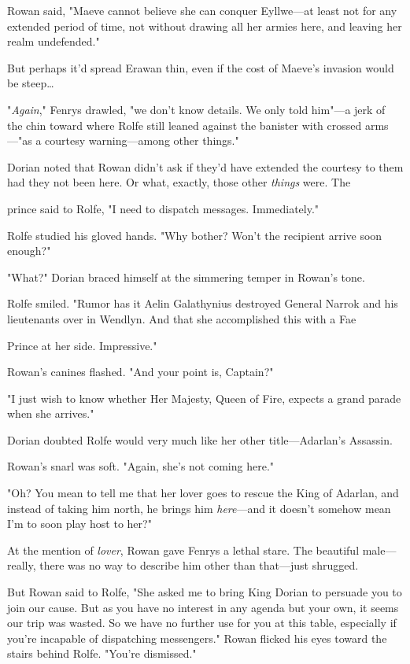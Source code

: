 Rowan said, "Maeve cannot believe she can conquer Eyllwe---at least not for any extended period of time, not without drawing all her armies here, and leaving her realm undefended."

But perhaps it'd spread Erawan thin, even if the cost of Maeve's invasion would be steep\ldots{}

"\emph{Again}," Fenrys drawled, "we don't know details. We only told him"---a jerk of the chin toward where Rolfe still leaned against the banister with crossed arms---"as a courtesy warning---among other things."

Dorian noted that Rowan didn't ask if they'd have extended the courtesy to them had they not been here. Or what, exactly, those other
\emph{things} were. The

prince said to Rolfe, "I need to dispatch messages. Immediately."

Rolfe studied his gloved hands. "Why bother? Won't the recipient arrive soon enough?"

"What?" Dorian braced himself at the simmering temper in Rowan's tone.

Rolfe smiled. "Rumor has it Aelin Galathynius destroyed General Narrok and his lieutenants over in Wendlyn. And that she accomplished this with a Fae

Prince at her side. Impressive."

Rowan's canines flashed. "And your point is, Captain?"

"I just wish to know whether Her Majesty, Queen of Fire, expects a grand parade when she arrives."

Dorian doubted Rolfe would very much like her other title---Adarlan's Assassin.

Rowan's snarl was soft. "Again, she's not coming here."

"Oh? You mean to tell me that her lover goes to rescue the King of Adarlan, and instead of taking him north, he brings him
\emph{here}---and it doesn't somehow mean I'm to soon play host to her?"

At the mention of \emph{lover}, Rowan gave Fenrys a lethal stare. The beautiful male---really, there was no way to describe him other than that---just shrugged.

But Rowan said to Rolfe, "She asked me to bring King Dorian to persuade you to join our cause. But as you have no interest in any agenda but your own, it seems our trip was wasted. So we have no further use for you at this table, especially if you're incapable of dispatching messengers." Rowan flicked his eyes toward the stairs behind Rolfe. "You're dismissed."

